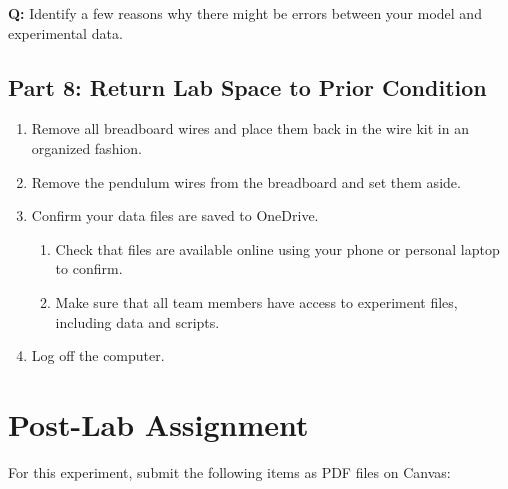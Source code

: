 \documentclass{article}
\begin{document}
\textbf{Q:} Identify a few reasons why there might be errors between your model and experimental data.

\subsection*{Part 8: Return Lab Space to Prior Condition}
\begin{enumerate}
    \item Remove all breadboard wires and place them back in the wire kit in an organized fashion.
    \item Remove the pendulum wires from the breadboard and set them aside.
    \item Confirm your data files are saved to OneDrive.
    \begin{enumerate}[label=\alph*.]
        \item Check that files are available online using your phone or personal laptop to confirm.
        \item Make sure that all team members have access to experiment files, including data and scripts.
    \end{enumerate}
    \item Log off the computer.
\end{enumerate}

\section{Post-Lab Assignment}
For this experiment, submit the following items as PDF files on Canvas:
\end{document}

